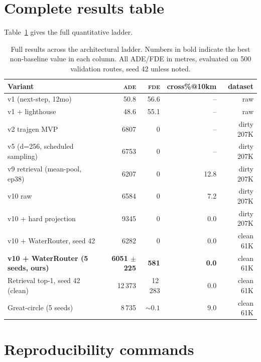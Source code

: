 \documentclass[11pt,a4paper]{article}
\newcommand{\ade}{\textsc{ade}}
\newcommand{\fde}{\textsc{fde}}
\begin{document}
\section{Complete results table}\label{app:results}

Table~\ref{tab:full_results} gives the full quantitative ladder.

\begin{table}[h]
\centering
\caption{Full results across the architectural ladder.  Numbers in bold
indicate the best non-baseline value in each column.  All ADE/FDE in
metres, evaluated on 500 validation routes, seed 42 unless noted.}
\label{tab:full_results}
\begin{tabular}{lrrrr}
\toprule
\textbf{Variant} & \ade & \fde & cross\%@10km & dataset \\
\midrule
v1 (next-step, 12mo)           & 50.8  & 56.6 & -- & raw \\
v1 + lighthouse                & 48.6  & 55.1 & -- & raw \\
v2 trajgen MVP                 & 6807  & 0    & -- & dirty 207K \\
v5 (d=256, scheduled sampling) & 6753  & 0    & -- & dirty 207K \\
v9 retrieval (mean-pool, ep38) & 6207  & 0    & 12.8 & dirty 207K \\
v10 raw                        & 6584  & 0    & 7.2  & dirty 207K \\
v10 + hard projection          & 9345  & 0    & 0.0  & dirty 207K \\
v10 + WaterRouter, seed 42     & 6282  & 0    & 0.0  & clean 61K \\
\textbf{v10 + WaterRouter (5 seeds, ours)}
       & \textbf{6051 $\pm$ 225} & \textbf{581} & \textbf{0.0}
       & clean 61K \\
\midrule
Retrieval top-1, seed 42 (clean) & 12\,373 & 12\,283 & 0.0
       & clean 61K \\
Great-circle (5 seeds)            & 8\,735  & $\sim 0.1$ & 9.0
       & clean 61K \\
\bottomrule
\end{tabular}
\end{table}

\section{Reproducibility commands}\label{app:repro}
\end{document}

